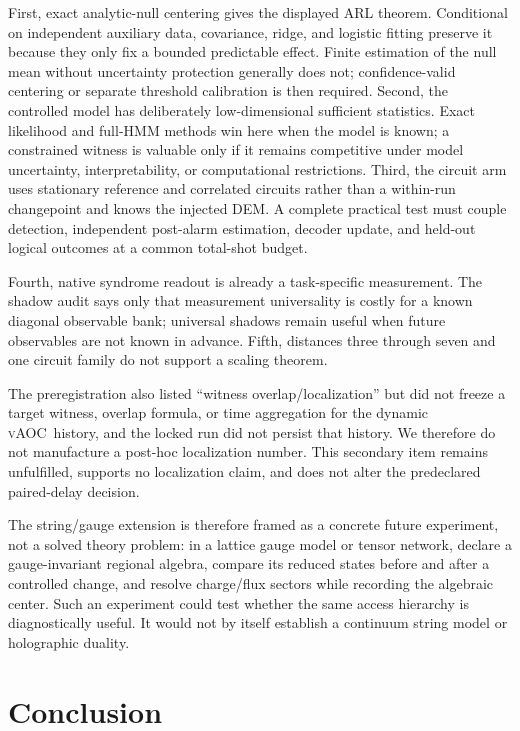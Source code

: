 \documentclass[letterpaper,journal]{IEEEtran}
\newcommand{\vAOC}{\textsc{vAOC}}
\begin{document}
First, exact analytic-null centering gives the displayed ARL theorem.
Conditional on independent auxiliary data, covariance, ridge, and logistic
fitting preserve it because they only fix a bounded predictable effect.
Finite estimation of the null mean without uncertainty protection generally
does not; confidence-valid centering or separate threshold calibration is
then required. Second, the controlled
model has deliberately low-dimensional sufficient statistics. Exact
likelihood and full-HMM methods win here when the model is known; a
constrained witness is valuable only if it remains competitive under model
uncertainty, interpretability, or computational restrictions. Third, the
circuit arm uses stationary reference and correlated circuits rather than a
within-run changepoint and knows the injected DEM. A complete practical test
must couple detection, independent post-alarm estimation, decoder update, and
held-out logical outcomes at a common total-shot budget.

Fourth, native syndrome readout is already a task-specific measurement. The
shadow audit says only that measurement universality is costly for a known
diagonal observable bank; universal shadows remain useful when future
observables are not known in advance. Fifth, distances three through seven
and one circuit family do not support a scaling theorem.

The preregistration also listed ``witness overlap/localization'' but did not
freeze a target witness, overlap formula, or time aggregation for the dynamic
\vAOC\ history, and the locked run did not persist that history. We therefore
do not manufacture a post-hoc localization number. This secondary item
remains unfulfilled, supports no localization claim, and does not alter the
predeclared paired-delay decision.

The string/gauge extension is therefore framed as a concrete future
experiment, not a solved theory problem: in a lattice gauge model or tensor
network, declare a gauge-invariant regional algebra, compare its reduced
states before and after a controlled change, and resolve charge/flux sectors
while recording the algebraic center. Such an experiment could test whether
the same access hierarchy is diagnostically useful. It would not by itself
establish a continuum string model or holographic duality.

\section{Conclusion}
\end{document}
